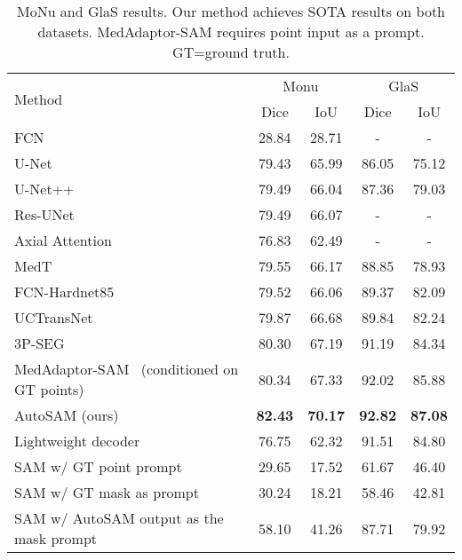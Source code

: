 \documentclass[runningheads]{llncs}
\begin{document}
\begin{table}[b!]
\begin{center}
\begin{tabular}{lcccc}
    \toprule
    \multirow{2}{*}{Method}&\multicolumn{2}{c}{Monu}&\multicolumn{2}{c}{GlaS}\\ \cmidrule(rl){2-3}
    \cmidrule(rl){4-5}
     & Dice & IoU &  Dice & IoU \\
    \midrule
    FCN~\cite{badrinarayanan2017segnet} & 28.84 &  28.71 & - & - \\
    U-Net~\cite{ronneberger2015u} & 79.43 & 65.99 & 86.05 & 75.12\\
    U-Net++~\cite{zhou2018unet++} & 79.49 & 66.04 & 87.36 & 79.03\\
    Res-UNet~\cite{xiao2018weighted} & 79.49 & 66.07 & - & - \\
    Axial Attention~\cite{wang2020axial} & 76.83 & 62.49 & - & - \\
    MedT~\cite{valanarasu2021medical} & 79.55 & 66.17 & 88.85 & 78.93\\
    FCN-Hardnet85~\cite{chao2019hardnet} & 79.52 & 66.06 & 89.37 & 82.09\\
    UCTransNet~\cite{wang2021uctransnet} & 79.87 & 66.68 & 89.84 & 82.24\\
    3P-SEG~\cite{shaharabany2022end} & 80.30 & 67.19 & 91.19 & 84.34\\
    MedAdaptor-SAM~\cite{wu2023medical} (conditioned on GT points) & 80.34 & 67.33 & 92.02 & 85.88\\
    AutoSAM (ours)& \textbf{82.43} & \textbf{70.17}  & \textbf{92.82} & \textbf{87.08}\\
    \midrule
    Lightweight decoder  & 76.75 & 62.32 & 91.51 & 84.80\\
SAM w/ GT point prompt & 29.65 & 17.52 & 61.67 & 46.40\\
SAM w/ GT mask as prompt & 30.24 & 18.21 & 58.46 & 42.81\\
    SAM w/ AutoSAM output as the mask prompt & 58.10 & 41.26 & 87.71 & 79.92 \\
    \bottomrule
    \end{tabular}
\end{center}
    \caption{MoNu and GlaS results. Our method achieves SOTA results on both datasets. MedAdaptor-SAM requires point input as a prompt. GT=ground truth.}
    \label{tab:Monu}
\end{table}
\end{document}
